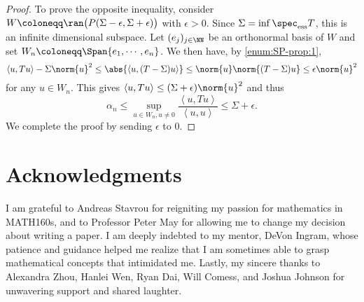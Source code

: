 \documentclass[oneside,reqno,letterpaper]{amsart}
\newcommand{\essspec}{\spec_{\text{ess}}}
\begin{document}
\begin{proof}
  To prove the opposite inequality, consider \(W \coloneqq \ran\big(P(\Sigma - \epsilon, \Sigma + \epsilon)\big)\) with \(\epsilon > 0\). 
  Since \(\Sigma = \inf \essspec T\), this is an infinite dimensional subspace. 
  Let \((e_j)_{j \in \NN}\) be an orthonormal basis of \(W\) and set \(W_n \coloneqq \Span \{e_1, \cdots, e_n\}\).
  We then have, by  \ref{enum:SP-prop:1}, 
  \[
    \left< u, Tu \right> - \Sigma \norm{u}^2  
    \leq \abs{\left< u, (T - \Sigma)u \right>} 
    \leq \norm{u} \norm{(T - \Sigma)u} 
    \leq \epsilon \norm{u}^2 
  \] 
  for any \(u \in W_n\). 
  This gives \(\left< u, Tu \right> \leq (\Sigma + \epsilon) \norm{u}^2 \) and thus
  \[
    \alpha_n \leq \sup_{u \in W_n, u \neq 0} \frac{\left< u, Tu \right>}{\left< u, u \right>} \leq \Sigma + \epsilon . 
  \] 
  We complete the proof by sending \(\epsilon\) to \(0\). 
\end{proof}







\section*{Acknowledgments}
I am grateful to Andreas Stavrou for reigniting my passion for mathematics in MATH160s, and to Professor Peter May for allowing me to change my decision about writing a paper.
I am deeply indebted to my mentor, DeVon Ingram, whose patience and guidance helped me realize that I am sometimes able to grasp mathematical concepts that intimidated me. 
Lastly, my sincere thanks to Alexandra Zhou, Hanlei Wen, Ryan Dai, Will Comess, and Joshua Johnson for unwavering support and shared laughter. 





\printbibliography
\nocite{*}
\end{document}
